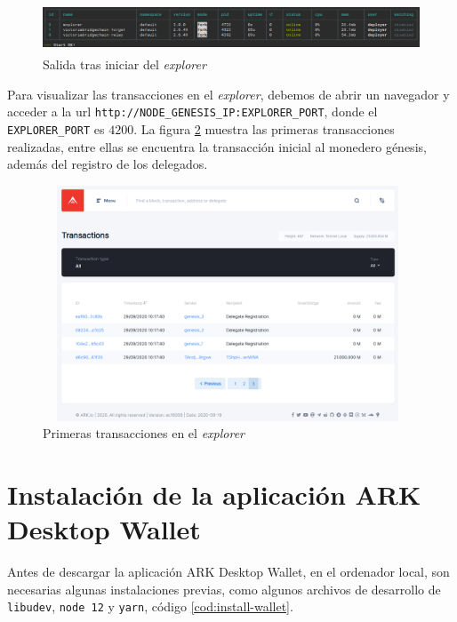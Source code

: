 \begin{figure}[H]
	\centering
	\includegraphics[width=12.5cm,height=1.5cm]{figuras/Instalacion_explorer.png}
	\caption{Salida tras iniciar del \textit{explorer}}
	\label{fig:install-explorer}
\end{figure}

Para visualizar las transacciones en el \textit{explorer}, debemos de abrir un navegador y acceder a la url \texttt{http://NODE\_GENESIS\_IP:EXPLORER\_PORT}, donde el \texttt{EXPLORER\_PORT} es $4200$. La figura \ref{fig:nav-explorer} muestra las primeras transacciones realizadas, entre ellas se encuentra la transacción inicial al monedero génesis, además del registro de los delegados.\\

\begin{figure}[H]
	\centering
	\includegraphics[width=11cm,height=7cm]{figuras/Navegacion_explorer.png}
	\caption{Primeras transacciones en el \textit{explorer}}
	\label{fig:nav-explorer}
\end{figure}


\newpage
\section{Instalación de la aplicación ARK Desktop Wallet}
\label{sec:manual-wallet}

Antes de descargar la aplicación ARK Desktop Wallet, en el ordenador local, son necesarias algunas instalaciones previas, como algunos archivos de desarrollo de \texttt{libudev}, \texttt{node 12} y \texttt{yarn}, código \ref{cod:install-wallet}.\\

